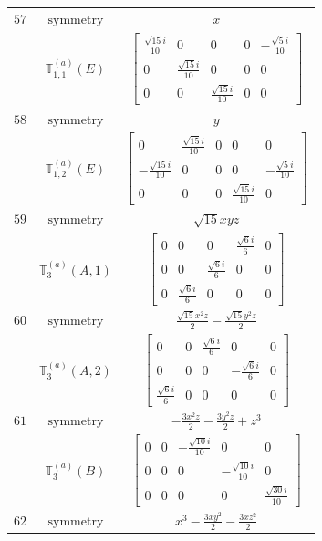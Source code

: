 \documentclass[fleqn,8pt,landscape]{jsarticle}
\begin{document}
\begin{longtable}{ccc}
$ 57 $ & $ \text{symmetry} $ & $ x $ \\
$  $ & $ \mathbb{T}_{1,1}^{(a)}(E) $ & $ \begin{bmatrix} \frac{\sqrt{15} i}{10} & 0 & 0 & 0 & - \frac{\sqrt{5} i}{10} \\ 0 & \frac{\sqrt{15} i}{10} & 0 & 0 & 0 \\ 0 & 0 & \frac{\sqrt{15} i}{10} & 0 & 0 \end{bmatrix} $ \\ \hline
$ 58 $ & $ \text{symmetry} $ & $ y $ \\
$  $ & $ \mathbb{T}_{1,2}^{(a)}(E) $ & $ \begin{bmatrix} 0 & \frac{\sqrt{15} i}{10} & 0 & 0 & 0 \\ - \frac{\sqrt{15} i}{10} & 0 & 0 & 0 & - \frac{\sqrt{5} i}{10} \\ 0 & 0 & 0 & \frac{\sqrt{15} i}{10} & 0 \end{bmatrix} $ \\ \hline
$ 59 $ & $ \text{symmetry} $ & $ \sqrt{15} x y z $ \\
$  $ & $ \mathbb{T}_{3}^{(a)}(A,1) $ & $ \begin{bmatrix} 0 & 0 & 0 & \frac{\sqrt{6} i}{6} & 0 \\ 0 & 0 & \frac{\sqrt{6} i}{6} & 0 & 0 \\ 0 & \frac{\sqrt{6} i}{6} & 0 & 0 & 0 \end{bmatrix} $ \\ \hline
$ 60 $ & $ \text{symmetry} $ & $ \frac{\sqrt{15} x^{2} z}{2} - \frac{\sqrt{15} y^{2} z}{2} $ \\
$  $ & $ \mathbb{T}_{3}^{(a)}(A,2) $ & $ \begin{bmatrix} 0 & 0 & \frac{\sqrt{6} i}{6} & 0 & 0 \\ 0 & 0 & 0 & - \frac{\sqrt{6} i}{6} & 0 \\ \frac{\sqrt{6} i}{6} & 0 & 0 & 0 & 0 \end{bmatrix} $ \\ \hline
$ 61 $ & $ \text{symmetry} $ & $ - \frac{3 x^{2} z}{2} - \frac{3 y^{2} z}{2} + z^{3} $ \\
$  $ & $ \mathbb{T}_{3}^{(a)}(B) $ & $ \begin{bmatrix} 0 & 0 & - \frac{\sqrt{10} i}{10} & 0 & 0 \\ 0 & 0 & 0 & - \frac{\sqrt{10} i}{10} & 0 \\ 0 & 0 & 0 & 0 & \frac{\sqrt{30} i}{10} \end{bmatrix} $ \\ \hline
$ 62 $ & $ \text{symmetry} $ & $ x^{3} - \frac{3 x y^{2}}{2} - \frac{3 x z^{2}}{2} $ \\

\end{longtable}
\end{document}
